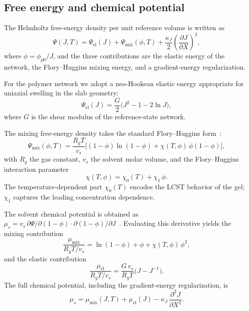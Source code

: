 \documentclass[aps,pre,reprint,superscriptaddress,longbibliography,floatfix]{revtex4-2}
\newcommand{\pp}{\phi_{p0}}
\begin{document}
\subsection{Free energy and chemical potential}

The Helmholtz free-energy density per unit reference volume is written as
\begin{equation}
  \Psi(J,T) = \Psi_\mathrm{el}(J) + \Psi_\mathrm{mix}(\phi,T)
  + \frac{\kappa_J}{2}\left(\frac{\partial J}{\partial X}\right)^2,
  \label{eq:Psi}
\end{equation}
where $\phi = \pp/J$, and the three contributions are the elastic
energy of the network, the Flory--Huggins mixing energy, and a
gradient-energy regularization.

For the polymer network we adopt a neo-Hookean elastic energy
appropriate for uniaxial swelling in the slab geometry:
\begin{equation}
  \Psi_\mathrm{el}(J) = \frac{G}{2}
  \bigl(J^{2} - 1 - 2\ln J\bigr),
  \label{eq:Psi_el}
\end{equation}
where $G$ is the shear modulus of the reference-state network.

The mixing free-energy density takes the standard Flory--Huggins
form~\cite{Flory1953}:
\begin{equation}
  \Psi_\mathrm{mix}(\phi,T)
  = \frac{R_g T}{v_s}
  \Big[(1-\phi)\ln(1-\phi) + \chi(T,\phi)\,\phi(1-\phi)\Big],
  \label{eq:Psi_mix}
\end{equation}
with $R_g$ the gas constant, $v_s$ the solvent molar volume, and
the Flory--Huggins interaction parameter
\begin{equation}
  \chi(T,\phi) = \chi_0(T) + \chi_1\,\phi.
  \label{eq:chi}
\end{equation}
The temperature-dependent part $\chi_0(T)$ encodes the LCST
behavior of the gel; $\chi_1$ captures the leading
concentration dependence.

The solvent chemical potential is obtained as
$\mu_s = v_s\,\partial\Psi/\partial(1-\phi)\cdot
\partial(1-\phi)/\partial J$~\cite{Hong2008}.  Evaluating this
derivative yields the mixing contribution
\begin{equation}
  \frac{\mu_\mathrm{mix}}{R_g T/v_s}
  = \ln(1-\phi) + \phi + \chi(T,\phi)\,\phi^2,
  \label{eq:mu_mix}
\end{equation}
and the elastic contribution
\begin{equation}
  \frac{\mu_\mathrm{el}}{R_g T/v_s}
  = \frac{G\,v_s}{R_g T}
  \bigl(J - J^{-1}\bigr).
  \label{eq:mu_el}
\end{equation}
The full chemical potential, including the gradient-energy
regularization, is
\begin{equation}
  \mu_s = \mu_\mathrm{mix}(J,T) + \mu_\mathrm{el}(J)
  - \kappa_J\,\frac{\partial^2 J}{\partial X^2}.
  \label{eq:mu_s}
\end{equation}
\end{document}

